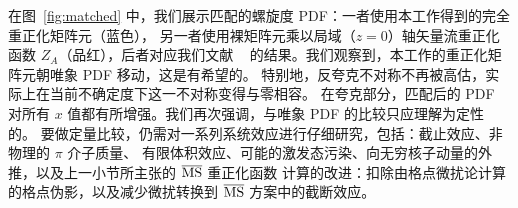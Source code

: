 \medskip
在图~\ref{fig:matched} 中，我们展示匹配的螺旋度 PDF：一者使用本工作得到的完全重正化矩阵元（蓝色），
另一者使用裸矩阵元乘以局域（$z{=}0$）轴矢量流重正化函数 $Z_A$（品红），后者对应我们文献
~\cite{Alexandrou:2016jqi} 的结果。我们观察到，本工作的重正化矩阵元朝唯象 PDF 移动，这是有希望的。
特别地，反夸克不对称不再被高估，实际上在当前不确定度下这一不对称变得与零相容。
在夸克部分，匹配后的 PDF 对所有 $x$ 值都有所增强。我们再次强调，与唯象 PDF 的比较只应理解为定性的。
要做定量比较，仍需对一系列系统效应进行仔细研究，包括：截止效应、非物理的 $\pi$ 介子质量、
有限体积效应、可能的激发态污染、向无穷核子动量的外推，以及上一小节所主张的 ${\overline{\rm MS}}$ 重正化函数
计算的改进：扣除由格点微扰论计算的格点伪影，以及减少微扰转换到 ${\overline{\rm MS}}$ 方案中的截断效应。
